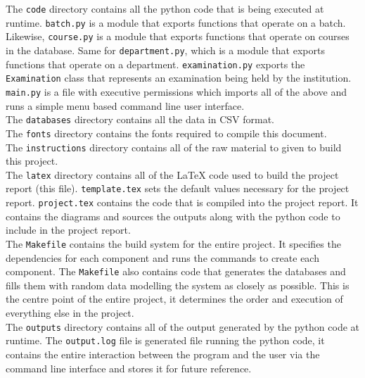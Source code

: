 \documentclass{article}
\begin{document}
		The \texttt{code} directory contains all the python code that is being executed at runtime.
		\texttt{batch.py} is a module that exports functions that operate on a batch.
		Likewise, \texttt{course.py} is a module that exports functions that operate on courses in the database.
		Same for \texttt{department.py}, which is a module that exports functions that operate on a department.
		\texttt{examination.py} exports the \texttt{Examination} class that represents an examination being held by the institution.\\
		\texttt{main.py} is a file with executive permissions which imports all of the above and runs a simple menu based command line user interface.\\

		The \texttt{databases} directory contains all the data in CSV format.\\

		The \texttt{fonts} directory contains the fonts required to compile this document.\\

		The \texttt{instructions} directory contains all of the raw material to given to build this project.\\

		The \texttt{latex} directory contains all of the \LaTeX{} code used to build the project report (this file).
		\texttt{template.tex} sets the default values necessary for the project report.
		\texttt{project.tex} contains the code that is compiled into the project report. It contains the diagrams and sources the outputs along with the python code to include in the project report.\\

		The \texttt{Makefile} contains the build system for the entire project. It specifies the dependencies for each component and runs the commands to create each component. The \texttt{Makefile} also contains code that generates the databases and fills them with random data modelling the system as closely as possible. This is the centre point of the entire project, it determines the order and execution of everything else in the project.\\

		The \texttt{outputs} directory contains all of the output generated by the python code at runtime.
		The \texttt{output.log} file is generated file running the python code, it contains the entire interaction between the program and the user via the command line interface and stores it for future reference.
\end{document}
